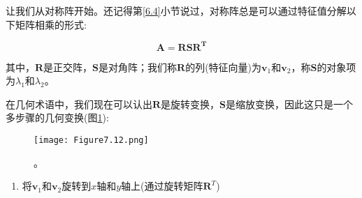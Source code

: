 让我们从对称阵开始。还记得第\ref{6.4}小节说过，对称阵总是可以通过特征值分解以下矩阵相乘的形式:

\begin{equation}
    \mathbf{A} = \mathbf{R}\mathbf{S}\mathbf{R}^{\mathbf{T}}
    \nonumber
\end{equation}

其中，$\mathbf{R}$是正交阵，$\mathbf{S}$是对角阵；我们称$\mathbf{R}$的列(特征向量)为$\mathbf{v}_{1}$和$\mathbf{v}_{2}$，称$\mathbf{S}$的对象项为$\lambda_{1}$和$\lambda_{2}$。

在几何术语中，我们现在可以认出$\mathbf{R}$是旋转变换，$\mathbf{S}$是缩放变换，因此这只是一个多步骤的几何变换(图\ref{fig:7.12}):

\begin{figure}[htbp]
	\centering
	\texttt{[image: Figure7.12.png]}
	\caption{。}
	\label{fig:7.12}
\end{figure}	

\begin{enumerate}
	\item 将$\mathbf{v}_{1}$和$\mathbf{v}_{2}$旋转到$x$轴和$y$轴上(通过旋转矩阵$\mathbf{R}^{T}$)
	
\end{enumerate}








